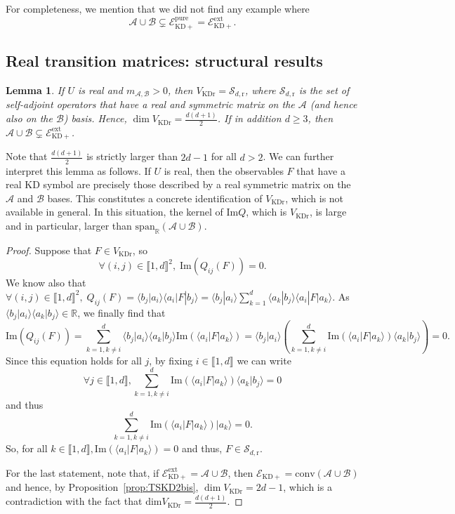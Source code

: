 \documentclass[a4paper, notitlepage, 11pt]{article}
\numberwithin{equation}{section}
\newcommand{\bra}[1]{\langle #1|}
\newcommand{\cket}[1]{|#1\rangle}
\newcommand{\bracket}[2]{\langle #1|#2\rangle}
\newcommand{\Acal}{{\mathcal A}}
\newcommand{\Bcal}{{\mathcal B}}
\newcommand{\EcalKDC}{{\mathcal E}_{\mathrm{KD+}}}
\newcommand{\EcalKDCpu}{{\mathcal E}_{\mathrm{KD+}}^{\mathrm{pure}}}
\newcommand{\EcalKDCext}{{\mathcal E}_{\mathrm{KD+}}^{\mathrm{ext}}}
\newcommand{\spanRAB}{{\mathrm{span}_{\R}(\Acal\cup\Bcal)}}
\newcommand{\R}{\mathbb{R}}
\newcommand{\mab}{m_{\Acal,\Bcal}}
\newcommand{\conv}[1]{\mathrm{conv}\left(#1\right)}
\newcommand{\VR}{V_{\mathrm{KDr}}}
\renewcommand{\Im}[1]{\mathrm{Im}#1}
\newcommand{\SAOr}{\mathcal{S}_{d,\mathrm r}}
\newcommand{\IntEnt}[2]{\llbracket #1 , #2 \rrbracket}
\newcommand{\convAB}{\conv{\Acal \cup \Bcal}}
\newtheorem{Lemma}[Theorem]{Lemma}
\begin{document}
For completeness, we mention that we did not find any example where
$$
\Acal\cup\Bcal\subsetneq \EcalKDCpu= \EcalKDCext.
$$

\subsection{Real transition matrices: structural results}\label{subsec:realTran}
\begin{Lemma}\label{lem:realU}
If $U$ is real and $\mab >0$, then $\VR={\SAOr}$, where ${\SAOr}$ is the set of self-adjoint operators that have a real and symmetric matrix on the $\Acal$ (and hence also on the $\Bcal$) basis. Hence, $\dim\VR=\frac{d(d+1)}{2}$. If in addition $d\geq 3$, then $\Acal\cup\Bcal\subsetneq \EcalKDCext$.
\end{Lemma}
Note that $\frac{d(d+1)}{2}$ is strictly larger than $2d-1$ for all $d>2$. We can further interpret this lemma as follows.   If $U$ is real, then the observables $F$ that have a real KD symbol are precisely those described by a real symmetric matrix on the $\Acal$ and $\Bcal$ bases. This constitutes a concrete identification of $\VR$, which is not available in general. 
In this situation, the kernel of $\textrm{Im} Q$, which is $\VR$, is large and in particular, larger than $\spanRAB$. 
\begin{proof} Suppose that $F\in\VR$, so
\[
\forall (i,j)\in\IntEnt{1}{d}^2, \; \Im(Q_{i j}(F))=0.
\]
We  know also that $\forall (i,j)\in\IntEnt{1}{d}^2, \; Q_{i j}(F) = \bracket{b_j}{a_i}\bra{a_i}F\cket{b_j}= \bracket{b_j}{a_i}\sum_{k=1}^{d}\bracket{a_k}{b_j}\bra{a_i}F\cket{a_k}$.
As $\bracket{b_j}{a_i}\bracket{a_k}{b_j}\in\R$, we finally find that
\[
\Im(Q_{i j}(F))=\sum_{k=1, k\neq i}^{d}\bracket{b_j}{a_i}\bracket{a_k}{b_j}\Im{\left(\bra{a_i}F\cket{a_k}\right)} = \bracket{b_j}{a_i} \left( \sum_{k=1, k\neq i}^{d}\Im{\left(\bra{a_i}F\cket{a_k}\right)} \bracket{a_k}{b_j}\right) =0. 
\]
Since this equation holds for all $j$, by fixing $i\in\IntEnt{1}{d}$ we can write
\[
\forall j\in\IntEnt{1}{d}, \sum_{k=1, k\neq i}^{d}\Im{\left(\bra{a_i}F\cket{a_k}\right)} \bracket{a_k}{b_j}=0
\] 
and thus
\[
\sum_{k=1, k\neq i}^{d}\Im{\left(\bra{a_i}F\cket{a_k}\right)}\cket{a_k}=0.
\]
So, for all $k\in\IntEnt{1}{d}, \Im{\left(\bra{a_i}F\cket{a_k}\right)}=0$ and thus, $F\in \SAOr$.

For the last statement, note that, if $\EcalKDCext=\Acal\cup\Bcal$, then $\EcalKDC=\convAB$ and hence, by Proposition~\ref{prop:TSKD2bis}, $\dim\VR=2d-1$, which is a contradiction with the fact that dim$\VR=\frac{d(d+1)}{2}$.
\end{proof}
\end{document}
